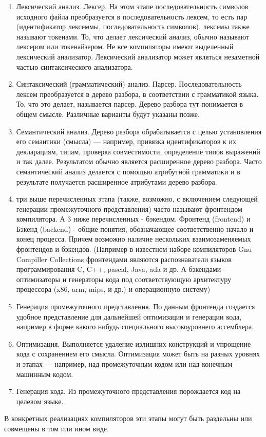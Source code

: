 \documentclass[a4paper,12pt]{article}
\begin{document}
\begin{enumerate}
  \item Лексический анализ. Лексер. На этом этапе последовательность символов
  исходного файла преобразуется в последовательность лексем, то есть пар (идентификатор
  лексеммы, последовательность символов). лексемы также называют токенами. То,
  что делает лексический анализ, обычно называют лексером или токенайзером.
  Не все компиляторы имеют выделенный лексический анализатор. Лексический
  анализатор может являться незаметной частью синтаксического анализатора.
  \item Синтаксический (грамматический) анализ. Парсер. Последовательность
  лексем преобразуется в дерево разбора, в соответствии с грамматикой языка. То,
  что это делает, называется парсер. Дерево разбора тут понимается в общем
  смысле. Различные варианты будут указаны позже.
  \item Семантический анализ. Дерево разбора обрабатывается с целью
  установления его семантики (смысла) — например, привязка идентификаторов к их
  декларациям, типам, проверка совместимости, определение типов выражений и так далее. Результатом обычно является расширенное дерево разбора. Часто семантический
  анализ делается с помощью атрибутной грамматики и в результате получается
  расширенное атрибутами дерево разбора.
  \item три выше перечисленных этапа (также, возможно, с включением следующей
  генерации промежуточного представления) часто называют фронтендом
  компилятора. А 3 ниже перечисленных - бэкендом. Фронтенд (frontend) и Бэкенд
  (backend) - общие понятия, обозначающее соответственно начало и конец
  процесса. Причем возможно наличие нескольких взаимозаменяемых фронтендов и
  бэкендов. (Например в известном наборе компиляторов Gnu Compiller Collections
  фронтендами являются распознаватели языков программирования C, C++, pascal,
  Java, ada и др. А бэкендами - оптимизаторы и генераторы кода под
  соответствующую архитектуру процессора (x86, arm, mips, и др.) и
  операционную систему)
  \item Генерация промежуточного представления. По данным фронтенда создается
  удобное представление для дальнейшей оптимизации и генерации кода, например в
  форме какого нибудь специального высокоуровнего ассемблера.
  \item Оптимизация. Выполняется удаление излишних конструкций и упрощение кода
  с сохранением его смысла. Оптимизация может быть на разных уровнях и этапах —
  например, над промежуточным кодом или над конечным машинным кодом.
  \item Генерация кода. Из промежуточного представления порождается код на
  целевом языке.
\end{enumerate}
В конкретных реализациях компиляторов эти этапы могут быть раздельны или
совмещены в том или ином виде. 
\end{document}
